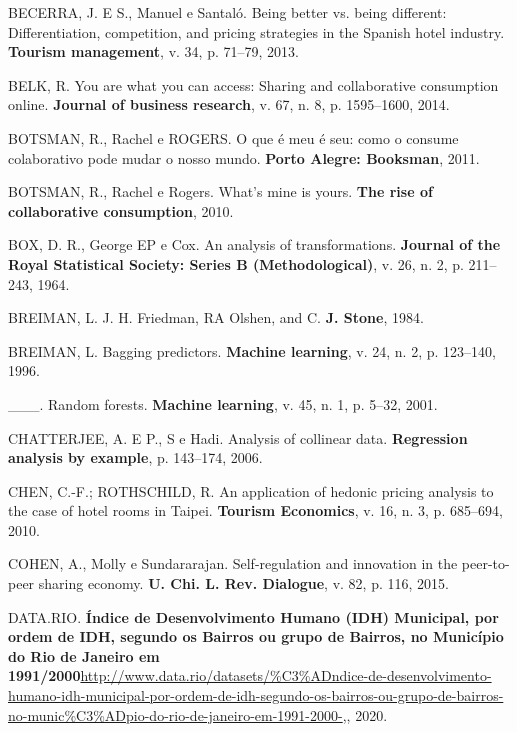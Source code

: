 \documentclass[
	12pt,				%
	a4paper,		%
	oneside,    %
	chapter=TITLE,		   %
	section=TITLE,		   %
	subsection=TITLE,	   %
	subsubsection=TITLE, %
	english,			%
	french,				%
	spanish,			%
	brazil,				%
]{abntex2}
\begin{document}
\leavevmode\hypertarget{ref-becerra2013being}{}%
BECERRA, J. E S., Manuel e Santaló. Being better vs. being different:
Differentiation, competition, and pricing strategies in the Spanish
hotel industry. \textbf{Tourism management}, v. 34, p. 71--79, 2013.

\leavevmode\hypertarget{ref-belk2014you}{}%
BELK, R. You are what you can access: Sharing and collaborative
consumption online. \textbf{Journal of business research}, v. 67, n. 8,
p. 1595--1600, 2014.

\leavevmode\hypertarget{ref-botsman2011meu}{}%
BOTSMAN, R., Rachel e ROGERS. O que é meu é seu: como o consume
colaborativo pode mudar o nosso mundo. \textbf{Porto Alegre: Booksman},
2011.

\leavevmode\hypertarget{ref-botsman2010s}{}%
BOTSMAN, R., Rachel e Rogers. What's mine is yours. \textbf{The rise of
collaborative consumption}, 2010.

\leavevmode\hypertarget{ref-box1964analysis}{}%
BOX, D. R., George EP e Cox. An analysis of transformations.
\textbf{Journal of the Royal Statistical Society: Series B
(Methodological)}, v. 26, n. 2, p. 211--243, 1964.

\leavevmode\hypertarget{ref-breiman1984j}{}%
BREIMAN, L. J. H. Friedman, RA Olshen, and C. \textbf{J. Stone}, 1984.

\leavevmode\hypertarget{ref-breiman1996bagging}{}%
BREIMAN, L. Bagging predictors. \textbf{Machine learning}, v. 24, n. 2,
p. 123--140, 1996.

\leavevmode\hypertarget{ref-breiman2001random}{}%
\_\_\_. Random forests. \textbf{Machine learning}, v. 45, n. 1, p.
5--32, 2001.

\leavevmode\hypertarget{ref-chatterjee2006analysis}{}%
CHATTERJEE, A. E P., S e Hadi. Analysis of collinear data.
\textbf{Regression analysis by example}, p. 143--174, 2006.

\leavevmode\hypertarget{ref-chen2010application}{}%
CHEN, C.-F.; ROTHSCHILD, R. An application of hedonic pricing analysis
to the case of hotel rooms in Taipei. \textbf{Tourism Economics}, v. 16,
n. 3, p. 685--694, 2010.

\leavevmode\hypertarget{ref-cohen2015self}{}%
COHEN, A., Molly e Sundararajan. Self-regulation and innovation in the
peer-to-peer sharing economy. \textbf{U. Chi. L. Rev. Dialogue}, v. 82,
p. 116, 2015.

\leavevmode\hypertarget{ref-datario}{}%
DATA.RIO. \textbf{Índice de Desenvolvimento Humano (IDH) Municipal, por
ordem de IDH, segundo os Bairros ou grupo de Bairros, no Município do
Rio de Janeiro em
1991/2000}\url{http://www.data.rio/datasets/\%C3\%ADndice-de-desenvolvimento-humano-idh-municipal-por-ordem-de-idh-segundo-os-bairros-ou-grupo-de-bairros-no-munic\%C3\%ADpio-do-rio-de-janeiro-em-1991-2000-},,
2020.
\end{document}
